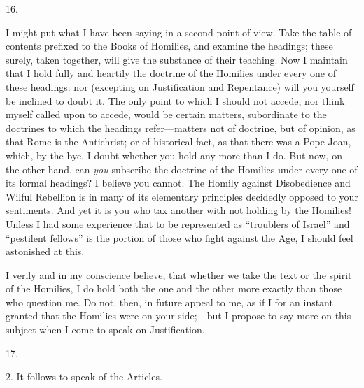 16.

I might put what I have been saying in a second
point of view. Take the table of contents prefixed to the Books of
Homilies, and examine the headings; these surely, taken together, will
give the substance of their teaching. Now I maintain that I hold fully
and heartily the doctrine of the Homilies under every one of
these headings: nor (excepting on Justification and Repentance) will
you yourself be inclined to doubt it. The only point to which I should
not accede, nor think myself called upon to accede, would be certain
matters, subordinate to the doctrines to which the headings
refer—matters not of doctrine, but of opinion, as that Rome is the
Antichrist; or of historical fact, as that there was a Pope Joan,
which, by-the-bye, I doubt whether you hold any more than I do. But
now, on the other hand, can \emph{you} subscribe the doctrine of the
Homilies under every one of its formal headings? I believe you cannot.
The Homily against Disobedience and Wilful Rebellion is in many of its
elementary principles decidedly opposed to your sentiments. And yet it
is you who tax another with not holding by the Homilies! Unless I had
some experience that to be represented as ``troublers of Israel'' and ``pestilent
fellows'' is the portion of those who fight against the Age, I should
feel astonished at this.

I verily and in my conscience believe, that
whether we take the text or the spirit of the Homilies, I do hold both
the one and the other more exactly than those who question me. Do not,
then, in future appeal to me, as if I for an instant granted that the
Homilies were on your side;—but I propose to say more on this
subject when I come to speak on Justification.

17.

2. It follows to speak of the Articles.

